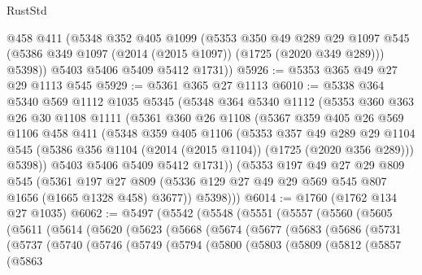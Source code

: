 \begin{lexlean}{RustStd}
\begin{coremodule}
{\begin{coremodule}
{{{{{{{{{{{{{        @458
        @411
        (@5348
          @352
          @405
          @1099
          (@5353
            @350
            @49
            @289
            @29
            @1097
            @545
            (@5386 @349 @1097 (@2014 (@2015 @1097)) (@1725 (@2020 @349 @289)))
            @5398))
        @5403
        @5406
        @5409
        @5412
        @1731))
@5926 := @5353 @365 @49 @27 @29 @1113 @545
@5929 := @5361 @365 @27 @1113
@6010 := @5338
    @364
    @5340
    @569
    @1112
    @1035
    @5345
    (@5348
      @364
      @5340
      @1112
      (@5353
        @360
        @363
        @26
        @30
        @1108
        @1111
        (@5361
          @360
          @26
          @1108
          (@5367
            @359
            @405
            @26
            @569
            @1106
            @458
            @411
            (@5348
              @359
              @405
              @1106
              (@5353
                @357
                @49
                @289
                @29
                @1104
                @545
                (@5386 @356 @1104 (@2014 (@2015 @1104)) (@1725 (@2020 @356 @289)))
                @5398))
            @5403
            @5406
            @5409
            @5412
            @1731))
        (@5353
          @197
          @49
          @27
          @29
          @809
          @545
          (@5361
            @197
            @27
            @809
            (@5336 @129 @27 @49 @29 @569 @545 @807 @1656 (@1665 @1328 @458) @3677))
          @5398)))
@6014 := @1760 (@1762 @134 @27 @1035)
@6062 := @5497
    (@5542
      (@5548
        (@5551
          (@5557
            (@5560
              (@5605
                (@5611
                  (@5614
                    (@5620
                      (@5623
                        (@5668
                          (@5674
                            (@5677
                              (@5683
                                (@5686
                                  (@5731
                                    (@5737
                                      (@5740
                                        (@5746
                                          (@5749
                                            (@5794
                                              (@5800
                                                (@5803
                                                  (@5809
                                                    (@5812
                                                      (@5857
                                                        (@5863
}}}}}}}}}}}}}
\end{coremodule}}
\end{coremodule}
\end{lexlean}
